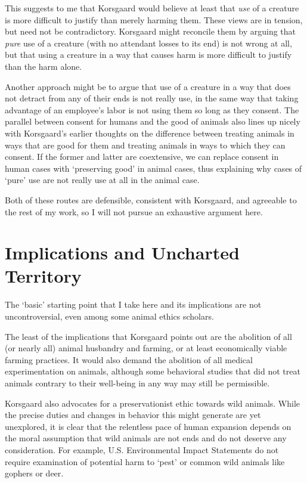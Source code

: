 		This suggests to me that Korsgaard would believe at least that
		\emph{use} of a creature is more difficult to justify than merely
		harming them. These views are in tension, but need not be
		contradictory.  Korsgaard might reconcile them by arguing that
		\emph{pure} use of a creature (with no attendant losses to its end) is
		not wrong at all, but that using a creature in a way that causes harm
		is more difficult to justify than the harm alone.

		Another approach might be to argue that use of a creature in a way that
		does not detract from any of their ends is not really use, in the same
		way that taking advantage of an employee’s labor is not using them so
		long as they consent. The parallel between consent for humans and the
		good of animals also lines up nicely with Korsgaard’s earlier thoughts
		on the difference between treating animals in ways that are good for
		them and treating animals in ways to which they can consent.
		If the former and latter are coextensive, we can replace consent in
		human cases with ‘preserving good’ in animal cases, thus explaining why
		cases of ‘pure’ use are not really use at all in the animal case.

		Both of these routes are defensible, consistent with Korsgaard, and
		agreeable to the rest of my work, so I will not pursue an exhaustive
		argument here.

	\section{Implications and Uncharted Territory}
		The ‘basic’ starting point that I take here and its implications are
		not uncontroversial, even among some animal ethics scholars.

		The least of the implications that Korsgaard points out are the
		abolition of all (or nearly all) animal husbandry and farming, or at
		least economically viable farming practices. It would also demand the
		abolition of all medical experimentation on animals, although some
		behavioral studies that did not treat animals contrary to their
		well-being in any way may still be permissible.

		Korsgaard also advocates for a preservationist ethic towards wild
		animals. While the precise duties and changes in behavior this might
		generate are yet unexplored, it is clear that the relentless pace of
		human expansion depends on the moral assumption that wild animals are
		not ends and do not deserve any consideration. For example, U.S.
		Environmental Impact Statements do not require examination of potential
		harm to ‘pest’ or common wild animals like gophers or
		deer.

